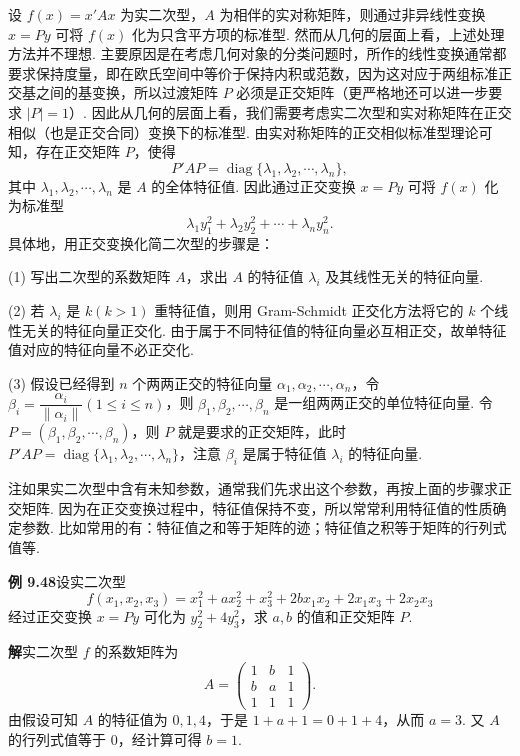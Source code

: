 \documentclass[UTF8,12pt,a4paper,fontset=fandol]{ctexart}
\begin{document}
设 $f(x)=x'Ax$ 为实二次型，$A$ 为相伴的实对称矩阵，则通过非异线性变换 $x=Py$ 可将 $f(x)$ 化为只含平方项的标准型. 然而从几何的层面上看，上述处理方法并不理想. 主要原因是在考虑几何对象的分类问题时，所作的线性变换通常都要求保持度量，即在欧氏空间中等价于保持内积或范数，因为这对应于两组标准正交基之间的基变换，所以过渡矩阵 $P$ 必须是正交矩阵（更严格地还可以进一步要求 $|P|=1$）. 因此从几何的层面上看，我们需要考虑实二次型和实对称矩阵在正交相似（也是正交合同）变换下的标准型. 由实对称矩阵的正交相似标准型理论可知，存在正交矩阵 $P$，使得
\[
P'AP=\operatorname{diag}\{\lambda_1,\lambda_2,\cdots,\lambda_n\},
\]
其中 $\lambda_1,\lambda_2,\cdots,\lambda_n$ 是 $A$ 的全体特征值. 因此通过正交变换 $x=Py$ 可将 $f(x)$ 化为标准型
\begin{equation}
\lambda_1y_1^2+\lambda_2y_2^2+\cdots+\lambda_ny_n^2.
\tag{9.10}
\end{equation}
具体地，用正交变换化简二次型的步骤是：

(1) 写出二次型的系数矩阵 $A$，求出 $A$ 的特征值 $\lambda_i$ 及其线性无关的特征向量.

(2) 若 $\lambda_i$ 是 $k(k>1)$ 重特征值，则用 Gram-Schmidt 正交化方法将它的 $k$ 个线性无关的特征向量正交化. 由于属于不同特征值的特征向量必互相正交，故单特征值对应的特征向量不必正交化.

(3) 假设已经得到 $n$ 个两两正交的特征向量 $\alpha_1,\alpha_2,\cdots,\alpha_n$，令 $\beta_i=\dfrac{\alpha_i}{\|\alpha_i\|}(1\le i\le n)$，则 $\beta_1,\beta_2,\cdots,\beta_n$ 是一组两两正交的单位特征向量. 令 $P=(\beta_1,\beta_2,\cdots,\beta_n)$，则 $P$ 就是要求的正交矩阵，此时 $P'AP=\operatorname{diag}\{\lambda_1,\lambda_2,\cdots,\lambda_n\}$，注意 $\beta_i$ 是属于特征值 $\lambda_i$ 的特征向量.

注\quad 如果实二次型中含有未知参数，通常我们先求出这个参数，再按上面的步骤求正交矩阵. 因为在正交变换过程中，特征值保持不变，所以常常利用特征值的性质确定参数. 比如常用的有：特征值之和等于矩阵的迹；特征值之积等于矩阵的行列式值等.

\noindent\textbf{例 9.48}\quad 设实二次型
\[
f(x_1,x_2,x_3)=x_1^2+ax_2^2+x_3^2+2bx_1x_2+2x_1x_3+2x_2x_3
\]
经过正交变换 $x=Py$ 可化为 $y_2^2+4y_3^2$，求 $a,b$ 的值和正交矩阵 $P$.

\noindent\textbf{解}\quad 实二次型 $f$ 的系数矩阵为
\[
A=\begin{pmatrix}
1&b&1\\
b&a&1\\
1&1&1
\end{pmatrix}.
\]
由假设可知 $A$ 的特征值为 $0,1,4$，于是 $1+a+1=0+1+4$，从而 $a=3$. 又 $A$ 的行列式值等于 0，经计算可得 $b=1$.
\end{document}
